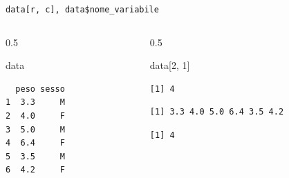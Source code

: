 \documentclass[
  ignorenonframetext,
  compress, aspectratio=149]{beamer}
\newenvironment{Shaded}{}{}
\newcommand{\DecValTok}[1]{\textcolor[rgb]{0.69,0.50,0.00}{#1}}
\newcommand{\NormalTok}[1]{\textcolor[rgb]{0.12,0.11,0.11}{#1}}
\newcommand{\SpecialCharTok}[1]{\textcolor[rgb]{0.24,0.68,0.91}{#1}}
\begin{document}
\begin{frame}[fragile]{}
\label{section-12}
\begin{verbatim}
data[r, c], data$nome_variabile
\end{verbatim}

\pause

\begin{columns}[T]
\begin{column}{0.5\linewidth}
\small

\begin{Shaded}
\begin{Highlighting}[]
\NormalTok{data}
\end{Highlighting}
\end{Shaded}

\begin{verbatim}
  peso sesso
1  3.3     M
2  4.0     F
3  5.0     M
4  6.4     F
5  3.5     M
6  4.2     F
\end{verbatim}
\end{column}

\begin{column}{0.5\linewidth}
\small

\begin{Shaded}
\begin{Highlighting}[]
\NormalTok{data[}\DecValTok{2}\NormalTok{, }\DecValTok{1}\NormalTok{]}
\end{Highlighting}
\end{Shaded}

\begin{verbatim}
[1] 4
\end{verbatim}

\begin{Shaded}
\end{Shaded}

\begin{verbatim}
[1] 3.3 4.0 5.0 6.4 3.5 4.2
\end{verbatim}

\begin{Shaded}
\end{Shaded}

\begin{verbatim}
[1] 4
\end{verbatim}
\end{column}
\end{columns}
\end{frame}
\end{document}
